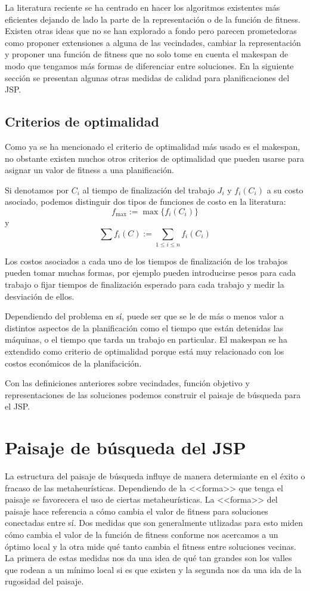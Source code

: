 La literatura reciente se ha centrado en hacer los algoritmos existentes más eficientes dejando de lado la parte de la representación o de la función de fitness. Existen otras ideas que no se han explorado a fondo pero parecen prometedoras como proponer extensiones a alguna de las vecindades, cambiar la representación y proponer una función de fitness que no solo tome en cuenta el makespan de modo que tengamos más formas de diferenciar entre soluciones. En la siguiente sección se presentan algunas otras medidas de calidad para planificaciones del JSP.
\subsection*{Criterios de optimalidad}
Como ya se ha mencionado el criterio de optimalidad más usado es el makespan, no obstante existen muchos otros criterios de optimalidad que pueden usarse para asignar un valor de fitness a una planificación. 

Si denotamos por $C_i$ al tiempo de finalización del trabajo $J_i$ y $f_i(C_i)$ a su costo asociado, podemos distinguir dos tipos de funciones de costo en la literatura\cite{Brucker2001}:
\[f_{\max}:=\max\{f_i(C_i)\}\]
y 
\[\sum f_i(C):=\sum_{1\leq i\leq n}f_i(C_i)\]

Los costos asociados a cada uno de los tiempos de finalización de los trabajos pueden tomar muchas formas, por ejemplo pueden introducirse pesos para cada trabajo o fijar tiempos de finalización esperado para cada trabajo y medir la desviación de ellos.

Dependiendo del problema en sí, puede ser que se le de más o menos valor a distintos aspectos de la planificación como el tiempo que están detenidas las máquinas, o el tiempo que tarda un trabajo en particular. El makespan se ha extendido como criterio de optimalidad porque está muy relacionado con los costos económicos de la planifacición\cite{Rand1977}.


Con las definiciones anteriores sobre vecindades, función objetivo y representaciones de las soluciones podemos construir el paisaje de búsqueda para el JSP. 
\section{Paisaje de búsqueda del JSP}

La estructura del paisaje de búsqueda influye de manera determiante en el éxito o fracaso de las metaheurísticas. Dependiendo de la <<forma>> que tenga el paisaje se favorecera el uso de ciertas metaheurísticas. La <<forma>> del paisaje hace referencia a cómo cambia el valor de fitness para soluciones conectadas entre sí. Dos medidas que son generalmente utlizadas para esto miden cómo cambia el valor de la función de fitness conforme nos acercamos a un óptimo local y la otra mide qué tanto cambia el fitness entre soluciones vecinas\cite{skauffman}. La primera de estas medidas nos da una idea de qué tan grandes son los valles que rodean a un mínimo local si es que existen y la segunda nos da una ida de la rugosidad del paisaje.

